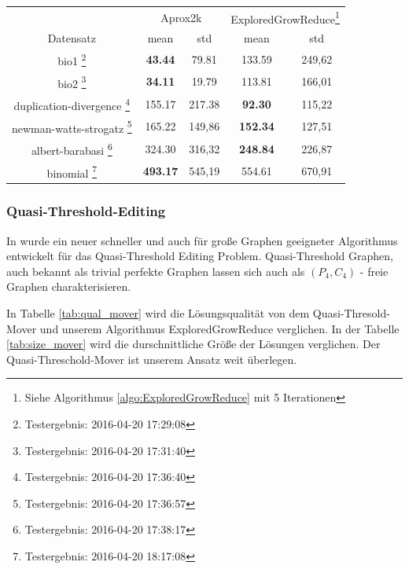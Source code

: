 \documentclass[12pt,a4paper,onecolumn,oneside,titlepage]{article}
\begin{document}
\begin{center}
\label{tab:size_2k}
\begin{tabular}{c|c c|c c} 
& \multicolumn{2}{c|}{Aprox2k} & \multicolumn{2}{c}{ExploredGrowReduce\footnote{Siehe Algorithmus \ref{algo:ExploredGrowReduce} mit 5 Iterationen }} \\ 
Datensatz & \multicolumn{1}{c}{mean}  &  \multicolumn{1}{c|}{std} &  \multicolumn{1}{c}{mean} &  \multicolumn{1}{c}{std} \\ 
\hline 
bio1 \footnote{Testergebnis: 2016-04-20 17:29:08} & \textbf{43.44}  & 79.81 & 133.59 & 249,62 \\ 
bio2 \footnote{Testergebnis: 2016-04-20 17:31:40} & \textbf{34.11} & 19.79 & 113.81 & 166,01 \\ 
duplication-divergence \footnote{Testergebnis: 2016-04-20 17:36:40} & 155.17 & 217.38 & \textbf{92.30} & 115,22 \\ 
newman-watts-strogatz \footnote{Testergebnis: 2016-04-20 17:36:57} & 165.22 & 149,86 & \textbf{152.34} & 127,51 \\ 
albert-barabasi \footnote{Testergebnis: 2016-04-20 17:38:17} & 324.30 & 316,32 & \textbf{248.84} & 226,87 \\ 
binomial \footnote{Testergebnis: 2016-04-20 18:17:08} & \textbf{493.17} & 545,19 & 554.61 & 670,91 \\ 

\end{tabular} 
\end{center}


\subsubsection{Quasi-Threshold-Editing}


In \cite{BrandesHSW15} wurde ein neuer schneller und auch für große Graphen geeigneter Algorithmus entwickelt für das Quasi-Threshold Editing Problem. Quasi-Threshold Graphen, auch bekannt als trivial perfekte Graphen lassen sich auch als $(P_4, C_4)$ - freie Graphen charakterisieren. 

In Tabelle \ref{tab:qual_mover} wird die Lösungsqualität von dem Quasi-Thresold-Mover und unserem Algorithmus ExploredGrowReduce verglichen. In der Tabelle \ref{tab:size_mover} wird die durschnittliche Größe der Lösungen verglichen. 
Der Quasi-Threschold-Mover ist unserem Ansatz weit überlegen. 
\end{document}
